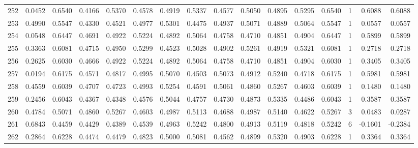 \begin{tabular}{lrrrrrrrrrrrrrrr}
252 &      0.0452 &  0.6540 &  0.4166 &  0.5370 &  0.4578 &  0.4919 &  0.5337 &  0.4577 &  0.5050 &  0.4895 &   0.5295 &     0.6540 &      1 &                    0.6088 &                     0.6088 \\
253 &      0.4990 &  0.5547 &  0.4330 &  0.4521 &  0.4977 &  0.5301 &  0.4475 &  0.4937 &  0.5071 &  0.4889 &   0.5064 &     0.5547 &      1 &                    0.0557 &                     0.0557 \\
254 &      0.0548 &  0.6447 &  0.4691 &  0.4922 &  0.5224 &  0.4892 &  0.5064 &  0.4758 &  0.4710 &  0.4851 &   0.4904 &     0.6447 &      1 &                    0.5899 &                     0.5899 \\
255 &      0.3363 &  0.6081 &  0.4715 &  0.4950 &  0.5299 &  0.4523 &  0.5028 &  0.4902 &  0.5261 &  0.4919 &   0.5321 &     0.6081 &      1 &                    0.2718 &                     0.2718 \\
256 &      0.2625 &  0.6030 &  0.4666 &  0.4922 &  0.5224 &  0.4892 &  0.5064 &  0.4758 &  0.4710 &  0.4851 &   0.4904 &     0.6030 &      1 &                    0.3405 &                     0.3405 \\
257 &      0.0194 &  0.6175 &  0.4571 &  0.4817 &  0.4995 &  0.5070 &  0.4503 &  0.5073 &  0.4912 &  0.5240 &   0.4718 &     0.6175 &      1 &                    0.5981 &                     0.5981 \\
258 &      0.4559 &  0.6039 &  0.4707 &  0.4723 &  0.4993 &  0.5254 &  0.4591 &  0.5061 &  0.4860 &  0.5267 &   0.4603 &     0.6039 &      1 &                    0.1480 &                     0.1480 \\
259 &      0.2456 &  0.6043 &  0.4367 &  0.4348 &  0.4576 &  0.5044 &  0.4757 &  0.4730 &  0.4873 &  0.5335 &   0.4486 &     0.6043 &      1 &                    0.3587 &                     0.3587 \\
260 &      0.4784 &  0.5071 &  0.4860 &  0.5267 &  0.4603 &  0.4987 &  0.5113 &  0.4688 &  0.4987 &  0.5140 &   0.4622 &     0.5267 &      3 &                    0.0483 &                     0.0287 \\
261 &      0.6843 &  0.4459 &  0.4429 &  0.4389 &  0.4539 &  0.4963 &  0.5242 &  0.4800 &  0.4913 &  0.5119 &   0.4818 &     0.5242 &      6 &                   -0.1601 &                    -0.2384 \\
262 &      0.2864 &  0.6228 &  0.4474 &  0.4479 &  0.4823 &  0.5000 &  0.5081 &  0.4562 &  0.4899 &  0.5320 &   0.4903 &     0.6228 &      1 &                    0.3364 &                     0.3364 \\

\end{tabular}
